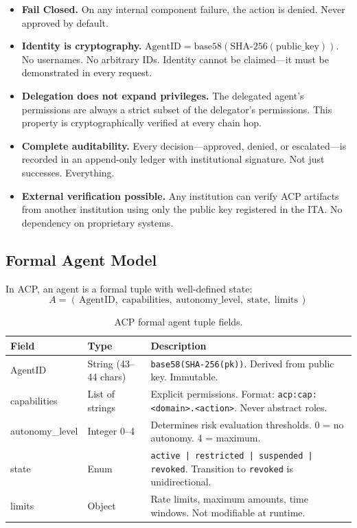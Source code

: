 \documentclass[11pt]{article}
\theoremstyle{definition}
\begin{document}
\begin{itemize}[noitemsep]
  \item[\textbf{P1}] \textbf{Fail Closed.}
        On any internal component failure, the action is denied. Never approved by default.
  \item[\textbf{P2}] \textbf{Identity is cryptography.}
        $\text{AgentID} = \text{base58}(\text{SHA-256}(\text{public\_key}))$.
        No usernames. No arbitrary IDs. Identity cannot be claimed---it must be demonstrated in every request.
  \item[\textbf{P3}] \textbf{Delegation does not expand privileges.}
        The delegated agent's permissions are always a strict subset of the delegator's permissions.
        This property is cryptographically verified at every chain hop.
  \item[\textbf{P4}] \textbf{Complete auditability.}
        Every decision---approved, denied, or escalated---is recorded in an append-only ledger with institutional signature. Not just successes. Everything.
  \item[\textbf{P5}] \textbf{External verification possible.}
        Any institution can verify ACP artifacts from another institution using only the public key registered in the ITA. No dependency on proprietary systems.
\end{itemize}

\subsection{Formal Agent Model}

In ACP, an agent is a formal tuple with well-defined state:
\[
A = (\, \text{AgentID},\; \text{capabilities},\; \text{autonomy\_level},\; \text{state},\; \text{limits} \,)
\]

\begin{table}[h!]
\centering
\small
\begin{tabular}{@{}llp{7cm}@{}}
\toprule
\textbf{Field} & \textbf{Type} & \textbf{Description} \\
\midrule
AgentID & String (43--44 chars) & \texttt{base58(SHA-256(pk))}. Derived from public key. Immutable. \\
capabilities & List of strings & Explicit permissions. Format: \texttt{acp:cap:<domain>.<action>}. Never abstract roles. \\
autonomy\_level & Integer 0--4 & Determines risk evaluation thresholds. 0 = no autonomy. 4 = maximum. \\
state & Enum & \texttt{active | restricted | suspended | revoked}. Transition to \texttt{revoked} is unidirectional. \\
limits & Object & Rate limits, maximum amounts, time windows. Not modifiable at runtime. \\
\bottomrule
\end{tabular}
\caption{ACP formal agent tuple fields.}
\end{table}
\end{document}

